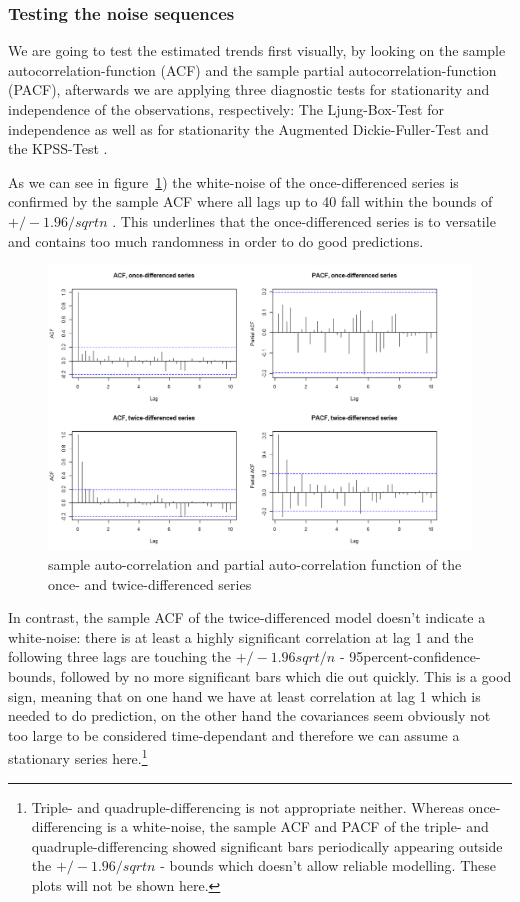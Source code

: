 \documentclass[11pt,a4paper]{article}
\begin{document}
\subsubsection{Testing the noise sequences}

We are going to test the estimated trends first visually, by looking on the sample autocorrelation-function (ACF) and the sample partial autocorrelation-function (PACF), afterwards we are applying three diagnostic tests for stationarity and independence of the observations, respectively:
The Ljung-Box-Test \citep{LjungBox78} for independence as well as for stationarity the Augmented Dickie-Fuller-Test \citep{adf} and the KPSS-Test \citep{kpss92}.

As we can see in figure~\ref{fig:diff12_acf_pacf}) the white-noise of the once-differenced series is confirmed by the sample ACF where all lags up to 40 fall within the bounds of $+/-1.96/sqrt{n}$ \cite[p.~39]{bd02}.
This underlines that the once-differenced series is to versatile and contains too much randomness in order to do good predictions.

\begin{figure}
    \centering
    \includegraphics[angle=0,width=1\textwidth]{diff12_acf_pacf}
    \caption{sample auto-correlation and partial auto-correlation function of the once- and twice-differenced series}
    \label{fig:diff12_acf_pacf}
\end{figure}

In contrast, the sample ACF of the twice-differenced model doesn't indicate a white-noise: there is at least a highly significant correlation at lag 1 and the following three lags are touching the $+/-1.96sqrt/{n}$ - 95percent-confidence-bounds, followed by no more significant bars which die out quickly.
This is a good sign, meaning that on one hand we have at least correlation at lag 1 which is needed to do prediction, on the other hand the covariances seem obviously not too large to be considered time-dependant and therefore we can assume a stationary series here.\footnote{
    Triple- and quadruple-differencing is not appropriate neither.
    Whereas once-differencing is a white-noise, the sample ACF and PACF of the triple- and quadruple-differencing showed significant bars periodically appearing outside the $+/-1.96/sqrt{n}$ - bounds which doesn't allow reliable modelling.
    These plots will not be shown here.
}
\end{document}
